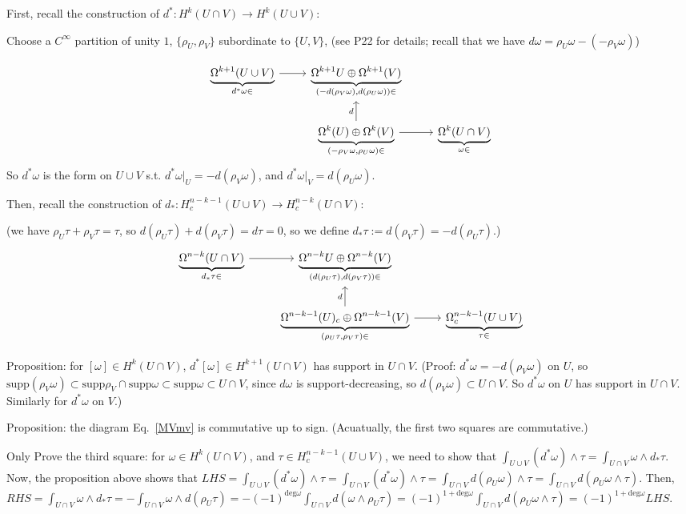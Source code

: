 \documentclass{article}
\theoremstyle{mystyle}
\theoremstyle{remark}
\numberwithin{equation}{section}
\begin{document}
First, recall the construction of $d^*\colon H^k(U\cap V)\rightarrow H^k(U\cup V)$:

Choose a $C^\infty$ partition of unity $1$, $\{\rho_U,\rho_V\}$ subordinate to $\{U,V\}$, (see P22 for details; recall that we have $d\omega = \rho_U\omega - (-\rho_V\omega)$)

$$\begin{tikzcd}
\underbrace{\Omega^{k+1}(U\cup V)}_{d^*\omega\in }\ar[r] &\underbrace{\Omega^{k+1}U\oplus \Omega^{k+1}(V)}_{(-d(\rho_V\omega),d(\rho_U\omega))\in}&\\ & \ar[u,"d"]\underbrace{\Omega^k(U)\oplus \Omega^k(V)}_{(-\rho_V\omega,\rho_U\omega)\in} \ar[r] & \underbrace{\Omega^k(U\cap V)}_{\omega\in}
\end{tikzcd}
$$
So $d^*\omega$ is the form on $U\cup V$ s.t. $d^*\omega|_U = -d(\rho_V\omega)$, and $d^*\omega|_V = d(\rho_U\omega)$. 

Then, recall the construction of $d_*\colon H^{n-k-1}_c(U\cup V)\rightarrow
H^{n-k}_c(U\cap V)$: 

(we have $\rho_U\tau + \rho_V\tau = \tau$, so $d(\rho_U\tau) + d(\rho_V\tau) = d\tau = 0$, so we define $d_*\tau := d(\rho_V\tau) = - d(\rho_U\tau)$.)
$$
\begin{tikzcd}
\underbrace{\Omega^{n-k}(U\cap V)}_{d_*\tau\in }\ar[r] &\underbrace{\Omega^{n-k}U\oplus \Omega^{n-k}(V)}_{(d(\rho_U\tau),d(\rho_V\tau))\in}&\\ & \ar[u,"d"]\underbrace{\Omega^{n-k-1}(U)_c\oplus \Omega^{n-k-1}(V)}_{(\rho_U\tau,\rho_V\tau)\in} \ar[r] & \underbrace{\Omega^{n-k-1}_c(U\cup V)}_{\tau\in}
\end{tikzcd}$$

Proposition: for $[\omega] \in H^k(U\cap V)$, $d^*[\omega] \in H^{k+1}(U\cap V)$ has support in $U\cap V$. (Proof: $d^*\omega = -d(\rho_V\omega)$ on $U$, so $\text{supp}(\rho_V\omega) \subset \text{supp}\rho_V\cap \text{supp}\omega \subset \text{supp}\omega \subset U\cap V$, since $d\omega$ is support-decreasing, so $d(\rho_V\omega) \subset U\cap V$. So $d^*\omega$ on $U$ has support in $U\cap V$. Similarly for $d^*\omega$ on $V$.)


Proposition: the diagram Eq.~\eqref{MVmv} is commutative up to sign. (Acuatually, the first two squares are commutative.)

Only Prove the third square: for $\omega \in H^k(U\cap V)$, and $\tau \in H^{n-k-1}_c(U\cup V)$,  we need to show that
$\int_{U\cup V}(d^*\omega)\wedge \tau = \int_{U\cap V} \omega \wedge d_*\tau$. Now, the proposition above shows that $LHS  =\int_{U\cup V}(d^*\omega)\wedge \tau
=
\int_{U\cap V}(d^*\omega)\wedge \tau
= \int_{U\cap V} d(\rho_U\omega)\wedge \tau
=\int_{U\cap V} d(\rho_U\omega \wedge \tau)$. Then, $RHS = \int_{U\cap V} \omega \wedge d_*\tau = -\int_{U\cap V} \omega \wedge d(\rho_U\tau) = - (-1)^{\text{deg}\omega}\int_{U\cap V}d(\omega \wedge \rho_U\tau) = (-1)^{1+\text{deg}\omega}
\int_{U\cap V} d(\rho_U\omega \wedge \tau) = (-1)^{1+\text{deg}\omega} LHS$.
\end{document}
